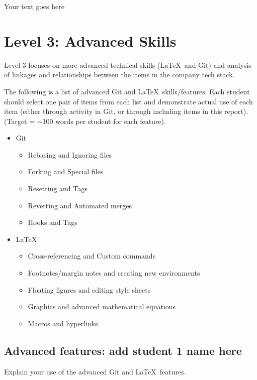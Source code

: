 \documentclass[a4paper, 11pt]{report}
\begin{document}
Your text goes here



\newpage
\section{Level 3: Advanced Skills}

Level 3 focuses on more advanced technical skills (\LaTeX\ and Git) and analysis of linkages and relationships between the items in the company tech stack.

The following is a list of advanced Git and \LaTeX\ skills/features. Each student should select one pair of items from each list and demonstrate actual use of each item (either through activity in Git, or through including items in this report). (Target = $\sim$100 words per student for each feature).
\begin{itemize}
    \item Git
    \begin{itemize}
        \item Rebasing and Ignoring files
        \item Forking and Special files
        \item Resetting and Tags
        \item Reverting and Automated merges
        \item Hooks and Tags
    \end{itemize}
    \item \LaTeX\ 
    \begin{itemize}
        \item Cross-referencing and Custom commands
        \item Footnotes/margin notes and creating new environments
        \item Floating figures and editing style sheets
        \item Graphics and advanced mathematical equations
        \item Macros and hyperlinks
    \end{itemize}
\end{itemize}

\subsection{Advanced features: add student 1 name here}

Explain your use of the advanced Git and \LaTeX\ features. 
\end{document}
